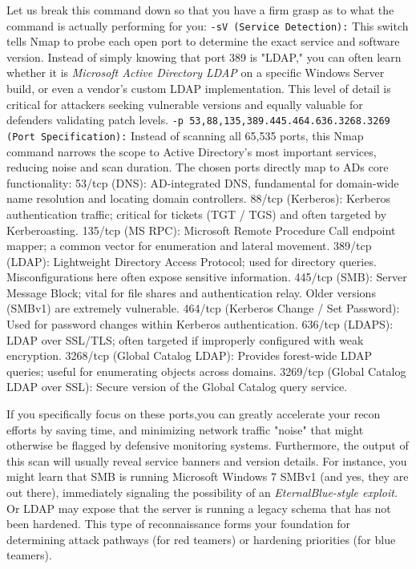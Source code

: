 Let us break this command down so that you have a firm grasp as to what the command is actually performing for you:
\texttt{-sV (Service Detection):} This switch tells Nmap to probe each open port to determine the exact service and software version. Instead of simply knowing that port 389 is "LDAP," you can often learn whether it is \textit{Microsoft Active Directory LDAP} on a specific Windows Server build, or even a vendor's custom LDAP implementation. This level of detail is critical for attackers seeking vulnerable versions and equally valuable for defenders validating patch levels.
\texttt{-p 53,88,135,389.445.464.636.3268.3269 (Port Specification):} Instead of scanning all 65,535 ports, this Nmap command narrows the scope to Active Directory's most important services, reducing noise and scan duration. The chosen ports directly map to ADs core functionality:
53/tcp (DNS): AD-integrated DNS, fundamental for domain-wide name resolution and locating domain controllers.
88/tcp (Kerberos): Kerberos authentication traffic; critical for tickets (TGT / TGS) and often targeted by Kerberoasting.
135/tcp (MS RPC): Microsoft Remote Procedure Call endpoint mapper; a common vector for enumeration and lateral movement.
389/tcp (LDAP): Lightweight Directory Access Protocol; used for directory queries. Misconfigurations here often expose sensitive information.
445/tcp (SMB): Server Message Block; vital for file shares and authentication relay. Older versions (SMBv1) are extremely vulnerable.
464/tcp (Kerberos Change / Set Password): Used for password changes within Kerberos authentication.
636/tcp (LDAPS): LDAP over SSL/TLS; often targeted if improperly configured with weak encryption.
3268/tcp (Global Catalog LDAP): Provides forest-wide LDAP queries; useful for enumerating objects across domains.
3269/tcp (Global Catalog LDAP over SSL): Secure version of the Global Catalog query service.

If you specifically focus on these ports,you can greatly accelerate your recon efforts by saving time, and minimizing network traffic "noise" that might otherwise be flagged by defensive monitoring systems.
 Furthermore, the output of this scan will usually reveal service banners and version details. For instance, you might learn that SMB is running Microsoft Windows 7 SMBv1 (and yes, they are out there), immediately signaling the possibility of an \textit{EternalBlue-style exploit.} Or LDAP may expose that the server is running a legacy schema that has not been hardened. This type of reconnaissance forms your foundation for determining attack pathways (for red teamers) or hardening priorities (for blue teamers).



